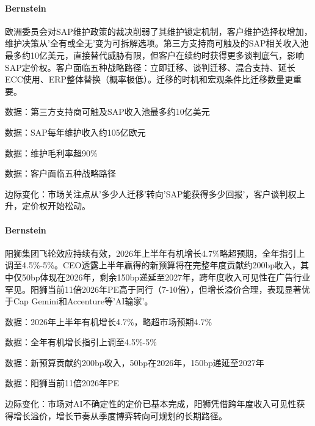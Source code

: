 \documentclass[11pt]{ctexart}
\begin{document}
\paragraph{Bernstein} 欧洲委员会对SAP维护政策的裁决削弱了其维护锁定机制，客户维护选择权增加，维护决策从'全有或全无'变为可拆解选项。第三方支持商可触及的SAP相关收入池最多约10亿美元，直接替代威胁有限，但客户在续约时获得更多谈判底气，影响SAP定价权。客户面临五种战略路径：立即迁移、谈判迁移、混合支持、延长ECC使用、ERP整体替换（概率极低）。迁移的时机和宏观条件比迁移数量更重要。
{\small\color{refgray}数据：第三方支持商可触及SAP收入池最多约10亿美元\par}
{\small\color{refgray}数据：SAP每年维护收入约105亿欧元\par}
{\small\color{refgray}数据：维护毛利率超90\%\par}
{\small\color{refgray}数据：客户面临五种战略路径\par}
{\small\color{refgray}边际变化：市场关注点从'多少人迁移'转向'SAP能获得多少回报'，客户谈判权上升，定价权开始松动。\par}
\paragraph{Bernstein} 阳狮集团飞轮效应持续有效，2026年上半年有机增长4.7\%略超预期，全年指引上调至4.5\%-5\%。CEO透露上半年赢得的新预算将在完整年度贡献约200bp收入，其中仅50bp体现在2026年，剩余150bp递延至2027年，跨年度收入可见性在广告行业罕见。阳狮当前11倍2026年PE高于同行（7-10倍），但增长溢价合理，表现显著优于Cap Gemini和Accenture等'AI输家'。
{\small\color{refgray}数据：2026年上半年有机增长4.7\%，略超市场预期4.7\%\par}
{\small\color{refgray}数据：全年有机增长指引上调至4.5\%-5\%\par}
{\small\color{refgray}数据：新预算贡献约200bp收入，50bp在2026年，150bp递延至2027年\par}
{\small\color{refgray}数据：阳狮当前11倍2026年PE\par}
{\small\color{refgray}边际变化：市场对AI不确定性的定价已基本完成，阳狮凭借跨年度收入可见性获得增长溢价，增长节奏从季度博弈转向可规划的长期路径。\par}
\end{document}
